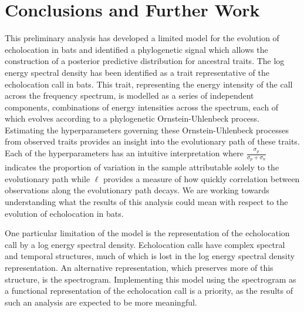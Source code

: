 \documentclass{ws-rv9x6}
\begin{document}
\section{Conclusions and Further Work}

This preliminary analysis has developed a limited model for the evolution of echolocation in bats and identified a phylogenetic signal which allows the construction of a posterior predictive distribution for ancestral traits. The log energy spectral density has been identified as a trait representative of the echolocation call in bats. This trait, representing the energy intensity of the call across the frequency spectrum, is modelled as a series of independent components, combinations of energy intensities across the spectrum, each of which evolves according to a phylogenetic Ornstein-Uhlenbeck process. Estimating the hyperparameters governing these Ornstein-Uhlenbeck processes from observed traits provides an insight into the evolutionary path of these traits. Each of the hyperparameters has an intuitive interpretation where \(\frac{\sigma_p}{\sigma_p + \sigma_n}\) indicates the proportion of variation in the sample attributable solely to the evolutionary path while \(\ell\) provides a measure of how quickly correlation between observations along the evolutionary path decays. We are working towards understanding what the results of this analysis could mean with respect to the evolution of echolocation in bats.

One particular limitation of the model is the representation of the echolocation call by a log energy spectral density. Echolocation calls have complex spectral and temporal structures, much of which is lost in the log energy spectral density representation. An alternative representation, which preserves more of this structure, is the spectrogram. Implementing this model using the spectrogram as a functional representation of the echolocation call is a priority, as the results of such an analysis are expected to be more meaningful.






\end{document}
